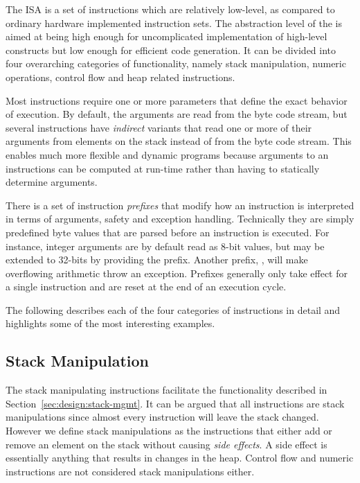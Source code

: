 The \thename{} ISA is a set of instructions which are relatively low-level, as
compared to ordinary hardware implemented instruction sets. The abstraction
level of the \thename{} is aimed at being high enough for uncomplicated
implementation of high-level constructs but low enough for efficient code
generation. It can be divided into four overarching categories of functionality,
namely stack manipulation, numeric operations, control flow and heap related
instructions.

Most instructions require one or more parameters that define the exact behavior
of execution. By default, the arguments are read from the byte code stream, but
several instructions have \emph{indirect} variants that read one or more of
their arguments from elements on the stack instead of from the byte code
stream. This enables much more flexible and dynamic programs because arguments
to an instructions can be computed at run-time rather than having to statically
determine arguments.

There is a set of instruction \emph{prefixes} that modify how an instruction is
interpreted in terms of arguments, safety and exception handling. Technically
they are simply predefined byte values that are parsed before an instruction is
executed. For instance, integer arguments are by default read as 8-bit values,
but may be extended to 32-bits by providing the  prefix. Another
prefix, , will make overflowing arithmetic throw an
exception. Prefixes generally only take effect for a single instruction and are
reset at the end of an execution cycle.

The following describes each of the four categories of instructions in detail
and highlights some of the most interesting examples.

\subsection{Stack Manipulation}

The stack manipulating instructions facilitate the functionality described in
Section~\ref{sec:design:stack-mgmt}. It can be argued that all instructions are
stack manipulations since almost every instruction will leave the stack
changed. However we define stack manipulations as the instructions that either
add or remove an element on the stack without causing \textit{side effects}. A
side effect is essentially anything that results in changes in the heap. Control
flow and numeric instructions are not considered stack manipulations either.

